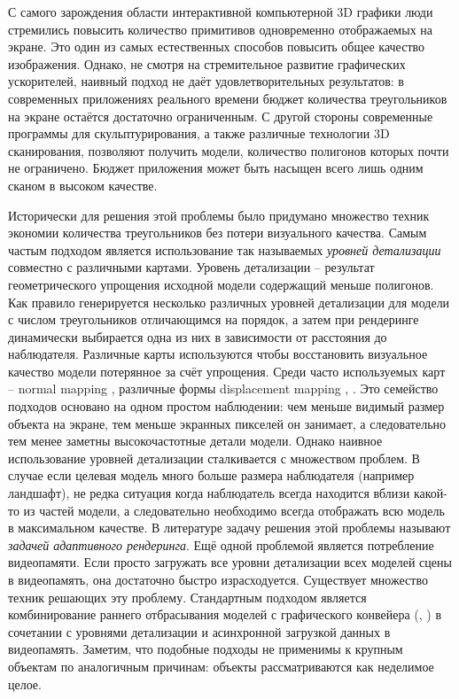 С самого зарождения области интерактивной компьютерной 3D графики люди стремились повысить количество примитивов одновременно отображаемых на экране. Это один из самых естественных способов повысить общее качество изображения. Однако, не смотря на стремительное развитие графических ускорителей, наивный подход не даёт удовлетворительных результатов: в современных приложениях реального времени бюджет количества треугольников на экране остаётся достаточно ограниченным. С другой стороны современные программы для скульптурирования, а также различные технологии 3D сканирования, позволяют получить модели, количество полигонов которых почти не ограничено. Бюджет приложения может быть насыщен всего лишь одним сканом в высоком качестве.

Исторически для решения этой проблемы было придумано множество техник экономии количества треугольников без потери визуального качества. Самым частым подходом является использование так называемых \emph{уровней детализации} совместно с различными картами. Уровень детализации -- результат геометрического упрощения исходной модели содержащий меньше полигонов. Как правило генерируется несколько различных уровней детализации для модели с числом треугольников отличающимся на порядок, а затем при рендеринге динамически выбирается одна из них в зависимости от расстояния до наблюдателя. Различные карты используются чтобы восстановить визуальное качество модели потерянное за счёт упрощения. Среди часто используемых карт -- normal mapping \cite{normalmapping}, различные формы displacement mapping \cite{reliefmapping}, \cite{displacementmapping}. Это семейство подходов основано на одном простом наблюдении: чем меньше видимый размер объекта на экране, тем меньше экранных пикселей он занимает, а следовательно тем менее заметны высокочастотные детали модели. Однако наивное использование уровней детализации сталкивается с множеством проблем. В случае если целевая модель много больше размера наблюдателя (например ландшафт), не редка ситуация когда наблюдатель всегда находится вблизи какой-то из частей модели, а следовательно необходимо всегда отображать всю модель в максимальном качестве. В литературе задачу решения этой проблемы называют \emph{задачей адаптивного рендеринга}. Ещё одной проблемой является потребление видеопамяти. Если просто загружать все уровни детализации всех моделей сцены в видеопамять, она достаточно быстро израсходуется. Существует множество техник решающих эту проблему. Стандартным подходом является комбинирование раннего отбрасывания моделей с графического конвейера (\cite{frustum_culling}, \cite{coorg1997real}) в сочетании с уровнями детализации и асинхронной загрузкой данных в видеопамять. Заметим, что подобные подходы не применимы к крупным объектам по аналогичным причинам: объекты рассматриваются как неделимое целое.

